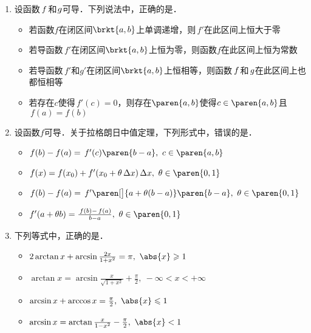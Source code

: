\documentclass[a4paper,punct=CCT]{ctexbook}
\theoremstyle{definition}
\theoremstyle{remark}
\newif\ifshowsol
\let\leq\leqslant
\let\le\leq
\let\geq\geqslant
\let\ge\geq}
\begin{document}
\begin{enumerate}
\item 设函数\(\,f\mkern2mu\)和\(\mkern1mu g\)可导．下列说法中，正确的是\uline{\hspace{10em}}．
  \begin{itemize}
    \renewcommand{\labelitemi}{\faCircleThin}
  \item 若函数\(f\)在闭区间\(\brkt{a,b}\)上单调递增，则\(\,f'\!\)在此区间上恒大于零
    \ifshowsol
  \item[\faCircle]
    \else
  \item
    \fi
    若导函数\(\,f'\!\)在闭区间\(\brkt{a,b}\)上恒为零，则函数\(f\)在此区间上恒为常数
  \item 若导函数\(\,f'\!\)和\(g'\!\)在闭区间\(\brkt{a,b}\)上恒相等，则函数\(\,f\mkern2mu\)和\(\mkern2mu g\)在此区间上也都恒相等
  \item 若存在\(c\)使得\(\,f'(c) = 0\)，则存在\(\paren{a,b}\)使得\(c \in \paren{a,b}\)且\(\,f(a) = f(b)\)
  \end{itemize}

  \ifshowsol
  函数\(x^3\)是选项A和D的反例．选项B就是推论~\ref{cor:lmvtconst}．选项C中的两个函数可能相差一个常数．
  \fi

\item 设函数\(f\)可导．关于拉格朗日中值定理，下列形式中，错误的是\uline{\hspace{10em}}．
  \begin{itemize}
    \renewcommand{\labelitemi}{\faCircleThin}
  \item \(f(b) - f(a) = \,f'(c) \paren{b-a},\ c \in \paren{a,b}\)
  \item \(f(x) = f(x_0) + f'(x_0 + \theta\fdx) \fdx,\ \theta \in \paren{0,1}\)
  \item \(f(b) - f(a) = \,f'\paren[\big]{a + \theta(b-a)} \paren{b-a},\ \theta \in \paren{0,1}\)
    \ifshowsol
  \item[\faCircle]
    \else
  \item
    \fi
    \(f'(a + \theta b) = \frac{\,f(b)-\,f(a)}{b-a},\ \theta \in \paren{0,1}\)
  \end{itemize}

\item 下列等式中，正确的是\uline{\hspace{10em}}．
  \begin{itemize}
    \renewcommand{\labelitemi}{\faCircleThin}
  \item \(2\arctan x + \arcsin\frac{2x}{1+x^2} = \pi,\ \abs{x} \ge 1\)
  \item \(\arctan x = \arcsin\frac{x}{\sqrt{1+x^2}} + \frac\pi2,\ -\infty < x < +\infty\)
    \ifshowsol
  \item[\faCircle]
    \else
  \item
    \fi
    \(\arcsin x + \arccos x = \frac\pi2,\ \abs{x} \le 1\)
  \item \(\arcsin x = \arctan\frac{x}{1-x^2} - \frac\pi2,\ \abs{x} < 1\)
  \end{itemize}


\end{enumerate}
\end{document}
